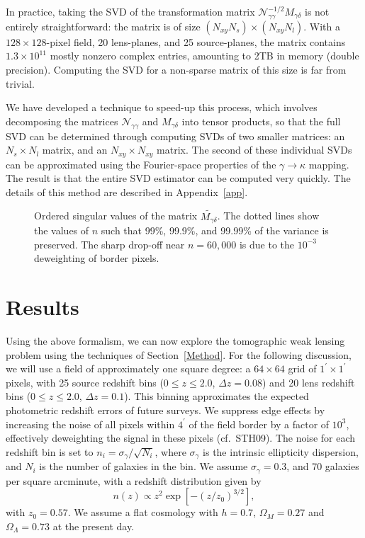 \documentclass[twocolumn]{emulateapj}
\newcommand{\mymat}[1]{#1}
\begin{document}
In practice, taking the SVD of the transformation matrix 
$\mathcal{N}_{\gamma\gamma}^{-1/2}M_{\gamma\delta}$
is not entirely straightforward: the matrix is of size 
$(N_{xy}N_s) \times (N_{xy}N_l)$.
With a $128 \times 128$-pixel field, 20 lens-planes, and 25 source-planes,
the matrix contains $1.3\times 10^{11}$ mostly nonzero complex entries, 
amounting to 2TB in memory (double precision).  
Computing the SVD for a non-sparse matrix of this size is far from trivial.

We have developed a technique to speed-up this process, which involves decomposing
the matrices $\mathcal{N}_{\gamma\gamma}$ and $M_{\gamma\delta}$ into tensor
products, so that the full SVD can be determined through computing SVDs of
two smaller matrices: an $N_s\times N_l$ matrix, 
and an $N_{xy}\times N_{xy}$ matrix.
The second of these individual SVDs can be approximated using the
Fourier-space properties of the $\gamma\to\kappa$ mapping.  The result is
that the entire SVD estimator can be computed very quickly.  The details
of this method are described in Appendix~\ref{app}.

\begin{figure*}[t] 
 \centering
 \caption{
   Ordered singular values of the matrix
   $\mymat{\widetilde{M_{\gamma\delta}}}$.
   The dotted lines show the values of $n$ 
   such that 99\%, 99.9\%, and 99.99\% of the variance is preserved.
   The sharp drop-off near $n=60,000$ is due to the $10^{-3}$ 
   deweighting of border pixels.
   \label{fig_sing_vals}}
\end{figure*}

\section{Results}
\label{Results}
\label{Parameters}
Using the above formalism, we can now explore the
tomographic weak lensing problem using the 
techniques of Section~\ref{Method}.
For the following discussion, we will use a field of approximately 
one square degree: a $64 \times 64$ grid of
$1^\prime \times 1^\prime$ pixels, with 25 source redshift
bins ($0\le z\le 2.0$, $\Delta z = 0.08$) and 20 lens redshift bins
($0\le z\le 2.0$, $\Delta z = 0.1$).  This binning approximates the 
expected photometric redshift errors of future surveys.
We suppress edge effects by increasing
the noise of all pixels within $4^\prime$ of the field border
by a factor of $10^3$, effectively
deweighting the signal in these pixels (cf.\ STH09).  The noise
for each redshift bin is set to $n_i = \sigma_\gamma/\sqrt{N_i}$, where 
$\sigma_\gamma$ is the intrinsic ellipticity dispersion, and
$N_i$ is the number of galaxies in the bin.  We assume $\sigma_\gamma = 0.3$,
and 70 galaxies per square arcminute, with a redshift distribution given by
\begin{equation}
  \label{gal_z_dist}
  n(z) \propto z^2\exp{\left[-(z/z_0)^{3/2}\right]},
\end{equation}
with $z_0 = 0.57$.  We assume a flat cosmology with 
$h=0.7$, $\Omega_M = 0.27$  and $\Omega_\Lambda = 0.73$ at the present day.
\end{document}
